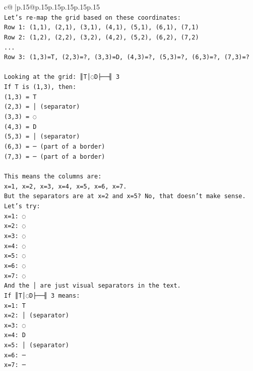 \documentclass{article}
\begin{document}
{\begin{supertabular}{c@{$\;$}|p{.15\linewidth}@{}p{.15\linewidth}p{.15\linewidth}p{.15\linewidth}p{.15\linewidth}p{.15\linewidth}}
{{{\\ 
\texttt{Let's re{-}map the grid based on these coordinates:} \\
\texttt{Row 1: (1,1), (2,1), (3,1), (4,1), (5,1), (6,1), (7,1)} \\
\texttt{Row 2: (1,2), (2,2), (3,2), (4,2), (5,2), (6,2), (7,2)} \\
\texttt{...} \\
\texttt{Row 3: (1,3)=T, (2,3)=?, (3,3)=D, (4,3)=?, (5,3)=?, (6,3)=?, (7,3)=?} \\
\\ 
\texttt{Looking at the grid: ║T│◌D├──╢ 3} \\
\texttt{If T is (1,3), then:} \\
\texttt{(1,3) = T} \\
\texttt{(2,3) = │ (separator)} \\
\texttt{(3,3) = ◌} \\
\texttt{(4,3) = D} \\
\texttt{(5,3) = │ (separator)} \\
\texttt{(6,3) = ─ (part of a border)} \\
\texttt{(7,3) = ─ (part of a border)} \\
\\ 
\texttt{This means the columns are:} \\
\texttt{x=1, x=2, x=3, x=4, x=5, x=6, x=7.} \\
\texttt{But the separators are at x=2 and x=5? No, that doesn't make sense.} \\
\texttt{Let's try:} \\
\texttt{x=1: ◌} \\
\texttt{x=2: ◌} \\
\texttt{x=3: ◌} \\
\texttt{x=4: ◌} \\
\texttt{x=5: ◌} \\
\texttt{x=6: ◌} \\
\texttt{x=7: ◌} \\
\texttt{And the │ are just visual separators in the text.} \\
\texttt{If ║T│◌D├──╢ 3 means:} \\
\texttt{x=1: T} \\
\texttt{x=2: │ (separator)} \\
\texttt{x=3: ◌} \\
\texttt{x=4: D} \\
\texttt{x=5: │ (separator)} \\
\texttt{x=6: ─} \\
\texttt{x=7: ─} \\
}}}
\end{supertabular}}
\end{document}
